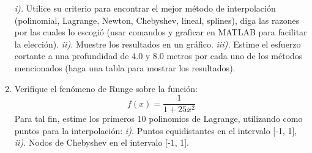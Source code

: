 \documentclass[letterpaper,12pt]{exam}
\begin{document}
\begin{enumerate}
 \emph{i).} Utilice su criterio para encontrar el mejor método de interpolación (polinomial, Lagrange, Newton, Chebyshev, lineal, splines), diga las razones por las cuales lo escogió (usar comandos y graficar en MATLAB para facilitar la elección). \emph{ii).} Muestre los resultados en un gráfico. \emph{iii).} Estime el esfuerzo cortante a una profundidad de 4.0 y 8.0 metros por cada uno de los métodos mencionados (haga una tabla para mostrar los resultados).
 
 \item Verifique el fenómeno de Runge sobre la función:
  \begin{equation}
   f(x)=\frac{1}{1+25x^2} 
  \end{equation}
 Para tal fin, estime los primeros 10 polinomios de Lagrange, utilizando como puntos para la interpolación: \emph{i).} Puntos equidistantes en el intervalo [-1, 1], \emph{ii).} Nodos de Chebyshev en el intervalo [-1, 1].  

\end{enumerate}
\end{document}
